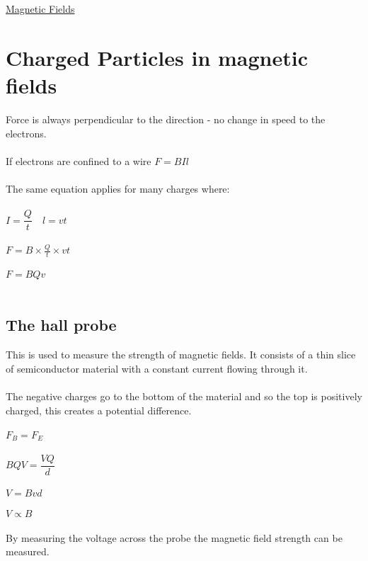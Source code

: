 \documentclass{article}[18pt]
\begin{document}
\begin{center}
\underline{\huge Magnetic Fields}
\end{center}
\section{Charged Particles in magnetic fields}
Force is always perpendicular to the direction - no change in speed to the electrons.\\
\\
If electrons are confined to a wire $F=BIl$\\
\\
The same equation applies for many charges where:\\
\\
$I=\dfrac{Q}{t} \quad l=vt$\\
\\
$F=B\times\frac{Q}{t}\times vt$\\
\\
$F=BQv$\\
\\
\subsection{The hall probe}
This is used to measure the strength of magnetic fields. It consists of a thin slice of semiconductor material with a constant current flowing through it.\\
\\
The negative charges go to the bottom of the material and so the top is positively charged, this creates a potential difference.\\
\\
$F_B=F_E$\\
\\
$BQV=\dfrac{VQ}{d}$\\
\\
$V=Bvd$\\
\\
$V\propto B$\\
\\
By measuring the voltage across the probe the magnetic field strength can be measured.
\end{document}
